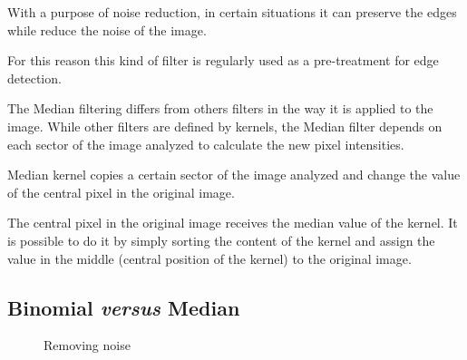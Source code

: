\documentclass{article}
\begin{document}
		With a purpose of noise reduction, in certain situations it can preserve the edges while reduce the noise of the image.

		For this reason this kind of filter is regularly used as a pre-treatment for edge detection.

		The Median filtering differs from others filters in the way it is applied to the image. While other filters are defined by kernels, the Median filter depends on each sector of the image analyzed to calculate the new pixel intensities.

		Median kernel copies a certain sector of the image analyzed and change the value of the central pixel in the original image. 

		The central pixel in the original image receives the median value of the kernel. It is possible to do it by simply sorting the content of the kernel and assign the value in the middle (central position of the kernel) to the original image. 

	\subsection{Binomial {\it versus} Median}

		\begin{figure}[H]
		  \centering
		  \caption{Removing noise}
		  \label{fig:removingnoise}
		\end{figure}		
\end{document}

